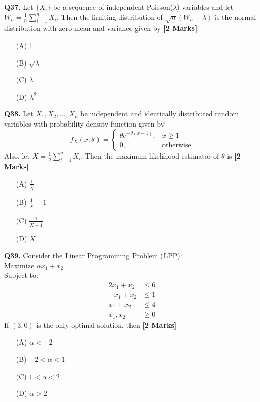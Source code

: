 \documentclass[11pt]{article}
\newcommand{\questionb}[2]{
    \noindent\textbf{Q#2.} #1 \hfill \textbf{[2 Marks]}
}
\begin{document}
\questionb{Let \( \{X_i\} \) be a sequence of independent Poisson(\( \lambda \)) variables and let \( W_n = \frac{1}{n} \sum_{i=1}^n X_i \). Then the limiting distribution of \( \sqrt{n}(W_n - \lambda) \) is the normal distribution with zero mean and variance given by}{37}
\begin{enumerate}
    \item[(A)] 1
    \item[(B)] \( \sqrt{\lambda} \)
    \item[(C)] \( \lambda \)
    \item[(D)] \( \lambda^2 \)
\end{enumerate}
\vspace{0.5cm}

\questionb{Let \( X_1, X_2, \ldots, X_n \) be independent and identically distributed random variables with probability density function given by \[
f_X(x; \theta) = \begin{cases}
\theta e^{-\theta(x - 1)}, & x \ge 1 \\
0, & \text{otherwise}
\end{cases}
\]
Also, let \( \bar{X} = \frac{1}{n} \sum_{i=1}^n X_i \). Then the maximum likelihood estimator of \( \theta \) is}{38}
\begin{enumerate}
    \item[(A)] \( \frac{1}{\bar{X}} \)
    \item[(B)] \( \frac{1}{\bar{X}} - 1 \)
    \item[(C)] \( \frac{1}{\bar{X} - 1} \)
    \item[(D)] \( \bar{X} \)
\end{enumerate}
\vspace{0.5cm}

\questionb{Consider the Linear Programming Problem (LPP):\\
Maximize \( \alpha x_1 + x_2 \)\\
Subject to: \\
\[
\begin{aligned}
2x_1 + x_2 &\le 6 \\
-x_1 + x_2 &\le 1 \\
x_1 + x_2 &\le 4 \\
x_1, x_2 &\ge 0
\end{aligned}
\]
If \( (3, 0) \) is the only optimal solution, then}{39}
\begin{enumerate}
    \item[(A)] \( \alpha < -2 \)
    \item[(B)] \( -2 < \alpha < 1 \)
    \item[(C)] \( 1 < \alpha < 2 \)
    \item[(D)] \( \alpha > 2 \)
\end{enumerate}
\vspace{0.5cm}
\end{document}
